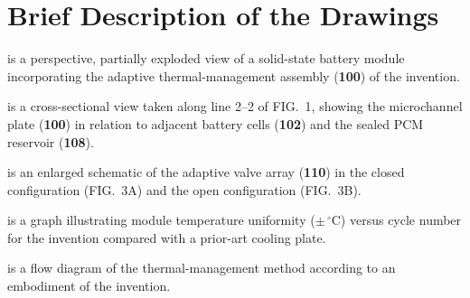 \section{Brief Description of the Drawings}

\begin{description}[leftmargin=2.2em, labelindent=0pt, itemsep=2pt]
  \item[FIG.~1] is a perspective, partially exploded view of a solid-state battery module
    incorporating the adaptive thermal-management assembly (\textbf{100}) of the invention.
  \item[FIG.~2] is a cross-sectional view taken along line 2--2 of FIG.~1, showing the
    microchannel plate (\textbf{100}) in relation to adjacent battery cells (\textbf{102})
    and the sealed PCM reservoir (\textbf{108}).
  \item[FIG.~3] is an enlarged schematic of the adaptive valve array (\textbf{110}) in the
    closed configuration (FIG.~3A) and the open configuration (FIG.~3B).
  \item[FIG.~4] is a graph illustrating module temperature uniformity ($\pm\,^{\circ}\mathrm{C}$)
    versus cycle number for the invention compared with a prior-art cooling plate.
  \item[FIG.~5] is a flow diagram of the thermal-management method according to an
    embodiment of the invention.
\end{description}

